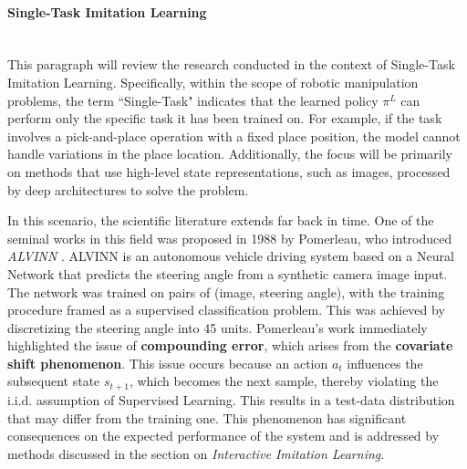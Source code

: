 \paragraph*{Single-Task Imitation Learning}\mbox{}\\
This paragraph will review the research conducted in the context of Single-Task Imitation Learning. Specifically, within the scope of robotic manipulation problems, the term ``Single-Task" indicates that the learned policy $\pi^{L}$ can perform only the specific task it has been trained on. For example, if the task involves a pick-and-place operation with a fixed place position, the model cannot handle variations in the place location. Additionally, the focus will be primarily on methods that use high-level state representations, such as images, processed by deep architectures to solve the problem.

In this scenario, the scientific literature extends far back in time. One of the seminal works in this field was proposed in 1988 by Pomerleau, who introduced \textit{ALVINN} \cite{pomerleau1988alvinn}. ALVINN is an autonomous vehicle driving system based on a Neural Network that predicts the steering angle from a synthetic camera image input. The network was trained on pairs of (image, steering angle), with the training procedure framed as a supervised classification problem. This was achieved by discretizing the steering angle into 45 units. Pomerleau's work immediately highlighted the issue of \textbf{compounding error}, which arises from the \textbf{covariate shift phenomenon}. This issue occurs because an action $a_{t}$ influences the subsequent state $s_{t+1}$, which becomes the next sample, thereby violating the i.i.d. assumption of Supervised Learning. This results in a test-data distribution that may differ from the training one. This phenomenon has significant consequences on the expected performance of the system and is addressed by methods discussed in the section on \textit{Interactive Imitation Learning}.

